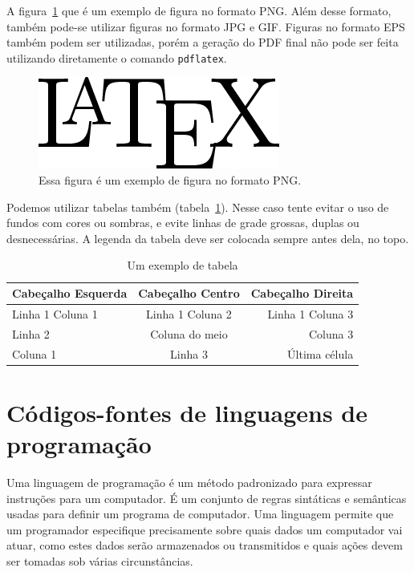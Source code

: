 A figura~\ref{fig:exemplo_png} que é um exemplo de figura no formato PNG. Além desse formato, também pode-se utilizar figuras no formato JPG e GIF. Figuras no formato EPS também podem ser utilizadas, porém a geração do PDF final não pode ser feita utilizando diretamente o comando \texttt{pdflatex}.

\begin{figure}[htbp]
\centering
\includegraphics[width=.5\textwidth]{figuras/latex-logo.png}
\caption{Essa figura é um exemplo de figura no formato PNG.}
\label{fig:exemplo_png}
\end{figure}

Podemos utilizar tabelas também (tabela~\ref{tab:exTabela}). Nesse caso tente evitar o uso de fundos com cores ou sombras, e evite linhas de grade grossas, duplas ou desnecessárias. A legenda da tabela deve ser colocada sempre antes dela, no topo.

\begin{table}[htbp]
\centering
\caption{Um exemplo de tabela}
\label{tab:exTabela}
\begin{tabular}{l|c|r} \hline
Cabeçalho Esquerda & Cabeçalho Centro & Cabeçalho Direita \\ 
\hline \hline
Linha 1 Coluna 1   & Linha 1 Coluna 2 & Linha 1 Coluna 3  \\
Linha 2            & Coluna do meio   & Coluna 3          \\
Coluna 1           & Linha 3          & Última célula     \\
\hline
\end{tabular}
\end{table}

\section{Códigos-fontes de linguagens de programação}

Uma linguagem de programação é um método padronizado para expressar instruções para um computador. É um conjunto de regras sintáticas e semânticas usadas para definir um programa de computador. Uma linguagem permite que um programador especifique precisamente sobre quais dados um computador vai atuar, como estes dados serão armazenados ou transmitidos e quais ações devem ser tomadas sob várias circunstâncias.

